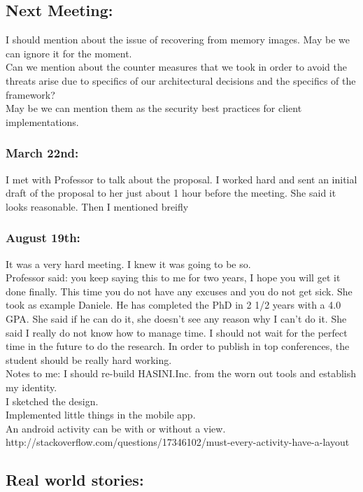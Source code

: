 \documentclass[11pt]{article}
\begin{document}
\subsection*{Next Meeting:}
I should mention about the issue of recovering from memory images. May be we can ignore it for the moment.\\
Can we mention about the counter measures that we took in order to avoid the threats arise due to specifics of our architectural decisions and the 
specifics of the framework?\\
May be we can mention them as the security best practices for client implementations.

\subsubsection*{March 22nd:}
I met with Professor to talk about the proposal. I worked hard and sent an initial draft of the proposal to her just about 1 hour before the meeting. 
She said it looks reasonable. Then I mentioned breifly

\subsubsection*{August 19th:}
It was a very hard meeting. I knew it was going to be so.\\
Professor said: you keep saying this to me for two years, I hope you will get it done finally. This time you do not have any excuses and you do not 
get sick. She took as example Daniele. He has completed the PhD in 2 1/2 years with a 4.0 GPA. She said if he can do it, she doesn't see any reason 
why I can't do it. She said I really do not know how to manage time. I should not wait for the perfect time in the future to do the research. In 
order to publish in top conferences, the student should be really hard working. \\

Notes to me: I should re-build HASINI.Inc. from the worn out tools and establish my identity.\\

I sketched the design.\\
Implemented little things in the mobile app.\\
An android activity can be with or without a view. http://stackoverflow.com/questions/17346102/must-every-activity-have-a-layout\\



\subsection*{Real world stories:}
\end{document}
